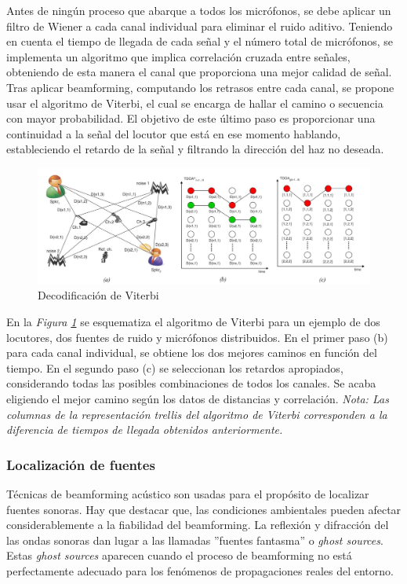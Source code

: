 \documentclass[a4paper,11pt]{book}
\begin{document}
			Antes de ningún proceso que abarque a todos los micrófonos, se debe aplicar un filtro de Wiener a cada canal individual para eliminar el ruido aditivo. Teniendo en cuenta el tiempo de llegada de cada señal y el número total de micrófonos, se implementa un algoritmo que implica correlación cruzada entre señales, obteniendo de esta manera el canal que proporciona una mejor calidad de señal. Tras aplicar beamforming, computando los retrasos entre cada canal, se propone usar el algoritmo de Viterbi, el cual se encarga de hallar el camino o secuencia con mayor probabilidad. El objetivo de este último paso es proporcionar una continuidad a la señal del locutor que está en ese momento hablando, estableciendo el retardo de la señal y filtrando la dirección del haz no deseada.	
			\begin{figure}[hbtp]
			\centering
			\includegraphics[width = 13cm]{FIGURAS/diarizacion.JPG}
			\caption{Decodificación de Viterbi}
			\label{viterbi}
			\end{figure}	
			
			En la \textit{Figura \ref{viterbi}} se esquematiza el algoritmo de Viterbi para un ejemplo de dos locutores, dos fuentes de ruido y micrófonos distribuidos. En el primer paso (b) para cada canal individual, se obtiene los dos mejores caminos en función del tiempo. En el segundo paso (c) se seleccionan los retardos apropiados, considerando todas las posibles combinaciones de todos los canales. Se acaba eligiendo el mejor camino según los datos de distancias y correlación.\linebreak 
			\textit{Nota: Las columnas de la representación trellis del algoritmo de Viterbi corresponden a la diferencia de tiempos de llegada obtenidos anteriormente.
}
			\subsubsection{Localización de fuentes}
			Técnicas de beamforming acústico son usadas para el propósito de localizar fuentes sonoras. Hay que destacar que, las condiciones ambientales pueden afectar considerablemente a la fiabilidad del beamforming. La reflexión y difracción del las ondas sonoras dan lugar a las llamadas ''fuentes fantasma'' o \textit{ghost sources}. Estas \textit{ghost sources} aparecen cuando el proceso de beamforming no está perfectamente adecuado para los fenómenos de propagaciones reales del entorno.
			
\end{document}
